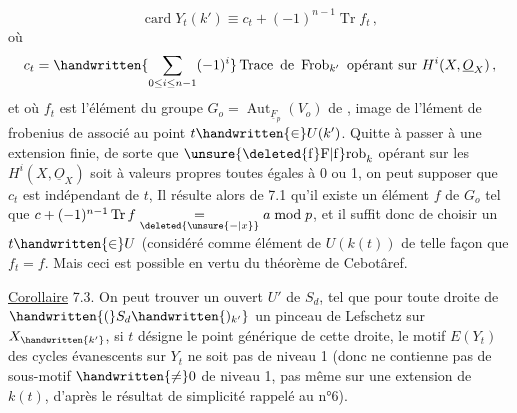 \[
\operatorname{card}Y_t(k')\equiv c_t+(-1)^{n-1}\operatorname{Tr}f_t\,,
\]
où 
\[
c_t=\handwritten{\sum_{0\leq i\leq n-1}(-1)^i}\operatorname{Trace}\text{ de }\operatorname{Frob}_{k'}\text{ opérant sur }H^i(X,\underline{O}_X)\,,
\]
et où $f_t$ est l'élément du groupe  $G_o=\operatorname{Aut}_{\underline{F}_p}(V_o)$ de \handwritten{$\pi$},  image de l'lément de frobenius de \handwritten{$\pi$} associé au point  $t\handwritten{\in}U(k')$. Quitte à passer à une extension finie,  de sorte que  $\operatorname{\unsure{\deleted{f}F|f}rob}_k$ opérant sur les $H^i(X,\underline{O}_X)$ soit à valeurs propres toutes égales à 0 ou 1, on peut supposer que $c_t$ est indépendant de $t$,  Il résulte alors de 7.1 qu'il existe un élément $f$ de $G_o$ tel que $c+(-1)^{n-1}\operatorname{Tr}f\underset{\deleted{\unsure{-|x}}}{=}a\bmod p$, et il suffit donc de choisir un $t\handwritten{\in}U$ (considéré comme élément de $U(k(t))$ de telle façon que $f_t=f$. Mais ceci est possible en vertu du théorème de \rlap{\handwritten{\v{\phantom{C}}}}Cebotâref.

\uline{Corollaire} 7.3.  On peut trouver un ouvert $U'$  de $S_d$, tel que pour toute droite  de $\handwritten{(}S_d\handwritten{)_{k'}}$  un pinceau de Lefschetz sur $X_{\handwritten{k'}}$, si $t$ désigne le point générique de cette droite, le motif $E(Y_t)$ des cycles évanescents sur $Y_t$  ne soit pas de niveau 1 (donc ne contienne pas de sous-motif $\handwritten{\ne}0$ de niveau 1, pas même sur une extension de $k(t)$, d'après le résultat de simplicité rappelé au n°6).

